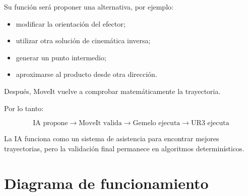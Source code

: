 \documentclass[12pt,letterpaper]{article}
\begin{document}
Su función será proponer una alternativa, por ejemplo:

\begin{itemize}[leftmargin=1.2cm]

    \item modificar la orientación del efector;
    \item utilizar otra solución de cinemática inversa;
    \item generar un punto intermedio;
    \item aproximarse al producto desde otra dirección.

\end{itemize}

Después, MoveIt vuelve a comprobar matemáticamente la trayectoria.

Por lo tanto:

\[
\text{IA propone}
\rightarrow
\text{MoveIt valida}
\rightarrow
\text{Gemelo ejecuta}
\rightarrow
\text{UR3 ejecuta}
\]

La IA funciona como un sistema de asistencia para encontrar mejores
trayectorias, pero la validación final permanece en algoritmos
determinísticos.

\section{Diagrama de funcionamiento}
\end{document}
